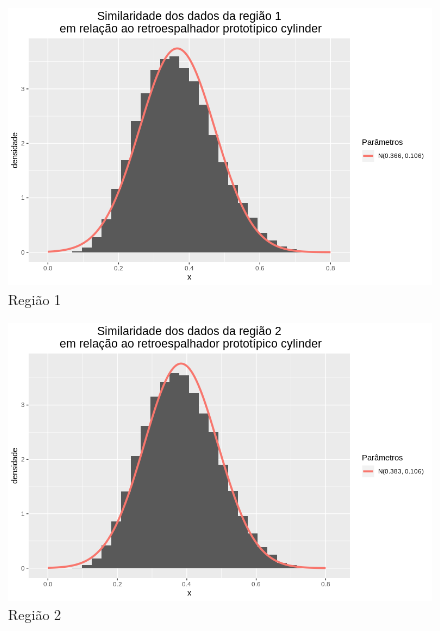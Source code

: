 \documentclass[12pt]{article}
\begin{document}
\begin{figure}[!h]
    \centering
    \vspace{0.05\linewidth}
    \includegraphics[width = \linewidth]{../../Images/Report_18_12_20/cy_region1.png}
    \caption{Região 1}
    \label{fig:cy_r1}
\end{figure}

\begin{figure}[!h]
    \centering
    \vspace{0.08\linewidth}
    \includegraphics[width = \linewidth]{../../Images/Report_18_12_20/cy_region2.png}
    \caption{Região 2}
    \label{fig:cy_r2}
\end{figure}
\end{document}
